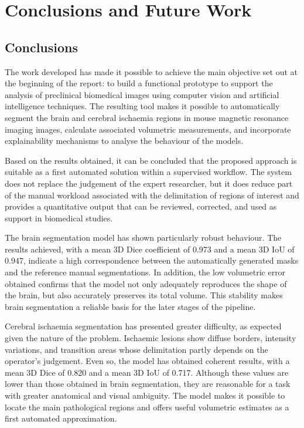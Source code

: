 \chapter*{Conclusions and Future Work}

\label{cap:conclusions}
\section*{Conclusions}

The work developed has made it possible to achieve the main objective set out at the beginning of the report: 
to build a functional prototype to support the analysis of preclinical biomedical images using computer vision and artificial intelligence techniques.
The resulting tool makes it possible to automatically segment the brain and cerebral ischaemia regions in mouse magnetic resonance imaging images, calculate 
associated volumetric measurements, and incorporate explainability mechanisms to analyse the behaviour of the models.

Based on the results obtained, it can be concluded that the proposed approach is suitable as a first automated solution within a supervised workflow.
The system does not replace the judgement of the expert researcher, but it does reduce part of the manual workload associated with the delimitation of regions of interest and provides 
a quantitative output that can be reviewed, corrected, and used as support in biomedical studies.

The brain segmentation model has shown particularly robust behaviour. The results achieved, with a mean 3D Dice coefficient of 0.973 and a mean 3D IoU 
of 0.947, indicate a high correspondence between the automatically generated masks and the reference manual segmentations. In addition, the low volumetric error obtained 
confirms that the model not only adequately reproduces the shape of the brain, but also accurately preserves its total volume. This stability makes brain segmentation 
a reliable basis for the later stages of the pipeline.

Cerebral ischaemia segmentation has presented greater difficulty, as expected given the nature of the problem. Ischaemic lesions show diffuse borders, 
intensity variations, and transition areas whose delimitation partly depends on the operator's judgement. Even so, the model has obtained coherent results, with a mean 3D Dice 
of 0.820 and a mean 3D IoU of 0.717. Although these values are lower than those obtained in brain segmentation, they are reasonable for a task with greater anatomical 
and visual ambiguity. The model makes it possible to locate the main pathological regions and offers useful volumetric estimates as a first automated approximation.

